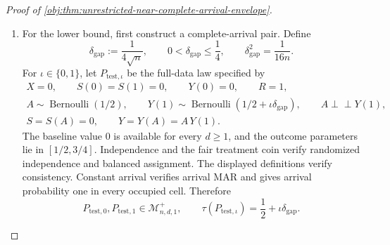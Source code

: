 \documentclass[11pt]{article}
\begin{document}
\begin{proof}[Proof of \cref{obj:thm:unrestricted-near-complete-arrival-envelope}]
\begin{enumerate}
Outcome consistency, randomized independence, and balanced assignment give
\[
\begin{aligned}
P(A=a,Y=1)
&=P(A=a,Y(a)=1)\\
&=P(A=a)P(Y(a)=1)
=\frac12P(Y(a)=1).
\end{aligned}
\]
Using the observed-record map and partitioning the outcome-one event according to arrival, we obtain
\[
\begin{aligned}
E_P[\xi_{\mathrm{obs}}(O_1)]
&=
2P(A=1,R=1,Y=1)-2P(A=0,R=1,Y=1)\\
&=
2P(A=1,Y=1)-2P(A=0,Y=1)
-\Delta_1(P)+\Delta_0(P)\\
&=\tau(P)-\Delta_1(P)+\Delta_0(P).
\end{aligned}
\]
The bounds on the two deficits imply
\[
-(1-q)
\le
E_P[\xi_{\mathrm{obs}}(O_1)]-\tau(P)
\le1-q,
\]
and hence, since \(1-q\ge0\),
\[
\left(E_P[\xi_{\mathrm{obs}}(O_1)]-\tau(P)\right)^2
\le(1-q)^2.
\]
Together with the preceding variance and clipping bounds, this gives
\[
\begin{aligned}
E_P\!\left[
\left(\widehat\tau^{\mathrm{HT}}_n(\mathbf O_n)-\tau(P)\right)^2
\right]
&\le
E_P\!\left[
\left(\overline\xi_n(\mathbf O_n)-\tau(P)\right)^2
\right]\\
&\le\frac4n+(1-q)^2.
\end{aligned}
\]
The clipped contrast is measurable on the finite sample space and takes values in \([-1,1]\). Since \(4/n+(1-q)^2\ge0\), the deterministic comparison gives both
\[
\mathfrak R^{+}_{n,d,q}\le\frac4n+(1-q)^2
\]
and
\[
\sup_{P\in\mathcal M^{+}_{n,d,q}}
E_P\!\left[
\left(\widehat\tau^{\mathrm{HT}}_n(\mathbf O_n)-\tau(P)\right)^2
\right]
\le\frac4n+(1-q)^2.
\]

\item For the lower bound, first construct a complete-arrival pair. Define
\[
\delta_{\mathrm{gap}}:=\frac1{4\sqrt n},
\qquad
0<\delta_{\mathrm{gap}}\le\frac14,
\qquad
\delta_{\mathrm{gap}}^2=\frac1{16n}.
\]
For \(\iota\in\{0,1\}\), let \(P_{\mathrm{test},\iota}\) be the full-data law specified by
\[
\begin{gathered}
X=0,\qquad S(0)=S(1)=0,\qquad Y(0)=0,\qquad R=1,\\
A\sim\operatorname{Bernoulli}(1/2),\qquad
Y(1)\sim\operatorname{Bernoulli}(1/2+\iota\delta_{\mathrm{gap}}),
\qquad A\perp\!\!\!\perp Y(1),\\
S=S(A)=0,\qquad Y=Y(A)=A\,Y(1).
\end{gathered}
\]
The baseline value \(0\) is available for every \(d\ge1\), and the outcome parameters lie in \([1/2,3/4]\). Independence and the fair treatment coin verify randomized independence and balanced assignment. The displayed definitions verify consistency. Constant arrival verifies arrival MAR and gives arrival probability one in every occupied cell. Therefore
\[
P_{\mathrm{test},0},P_{\mathrm{test},1}
\in\mathcal M^{+}_{n,d,1},
\qquad
\tau(P_{\mathrm{test},\iota})
=\frac12+\iota\delta_{\mathrm{gap}}.
\]


\end{enumerate}
\end{proof}
\end{document}
